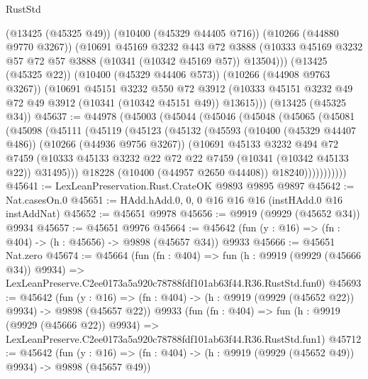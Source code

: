 \begin{lexlean}{RustStd}
\begin{coremodule}
        (@13425 (@45325 @49))
        (@10400 (@45329 @44405 @716))
        (@10266 (@44880 @9770 @3267))
        (@10691
          @45169
          @3232
          @443
          @72
          @3888
          (@10333 @45169 @3232 @57 @72 @57 @3888 (@10341 (@10342 @45169 @57)) @13504)))
      (@13425 (@45325 @22))
      (@10400 (@45329 @44406 @573))
      (@10266 (@44908 @9763 @3267))
      (@10691
        @45151
        @3232
        @550
        @72
        @3912
        (@10333 @45151 @3232 @49 @72 @49 @3912 (@10341 (@10342 @45151 @49)) @13615)))
    (@13425 (@45325 @34))
@45637 := @44978
    (@45003
      (@45044
        (@45046
          (@45048
            (@45065
              (@45081
                (@45098
                  (@45111
                    (@45119
                      (@45123
                        (@45132
                          (@45593
                            (@10400 (@45329 @44407 @486))
                            (@10266 (@44936 @9756 @3267))
                            (@10691
                              @45133
                              @3232
                              @494
                              @72
                              @7459
                              (@10333
                                @45133
                                @3232
                                @22
                                @72
                                @22
                                @7459
                                (@10341 (@10342 @45133 @22))
                                @31495)))
                          @18228
                          (@10400 (@44957 @2650 @44408))
                          @18240)))))))))))
@45641 := LexLeanPreservation.Rust.CrateOK @9893 @9895 @9897
@45642 := Nat.casesOn.{0}
@45651 := HAdd.hAdd.{0, 0, 0} @16 @16 @16 (instHAdd.{0} @16 instAddNat)
@45652 := @45651 @9978
@45656 := @9919 (@9929 (@45652 @34)) @9934
@45657 := @45651 @9976
@45664 := @45642 (fun (y : @16) => (fn : @404) -> (h : @45656) -> @9898 (@45657 @34)) @9933
@45666 := @45651 Nat.zero
@45674 := @45664
    (fun (fn : @404) =>
    fun (h : @9919 (@9929 (@45666 @34)) @9934) =>
    LexLeanPreserve.C2ee0173a5a920c78788fdf101ab63f44.R36.RustStd.fun0)
@45693 := @45642
    (fun (y : @16) => (fn : @404) -> (h : @9919 (@9929 (@45652 @22)) @9934) -> @9898 (@45657 @22))
    @9933
    (fun (fn : @404) =>
    fun (h : @9919 (@9929 (@45666 @22)) @9934) =>
    LexLeanPreserve.C2ee0173a5a920c78788fdf101ab63f44.R36.RustStd.fun1)
@45712 := @45642
    (fun (y : @16) => (fn : @404) -> (h : @9919 (@9929 (@45652 @49)) @9934) -> @9898 (@45657 @49))

\end{coremodule}
\end{lexlean}
